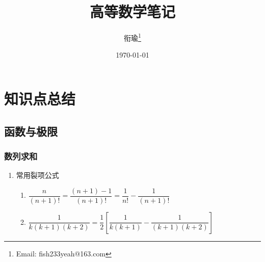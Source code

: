 \documentclass[12pt,a4paper,UTF8]{book}
\begin{document}
\frontmatter
\title{高等数学笔记}
\author{衔瑜\thanks{Email: fish233yeah@163.com}}
\date{\today}
\maketitle
\tableofcontents



\mainmatter
\setlength{\parindent}{0pt}
\chapter{知识点总结}

\section{函数与极限}
\subsection{数列求和}
\begin{enumerate}
\item 常用裂项公式
\begin{enumerate}
\item $\dfrac{n}{\left(n+1\right)!}=\dfrac{\left(n+1\right)-1}{\left(n+1\right)!}=\dfrac{1}{n!}-\dfrac{1}{\left(n+1\right)!}$
\item $\dfrac{1}{k\left(k+1\right)\left(k+2\right)}=\dfrac{1}{2}\left[\dfrac{1}{k\left(k+1\right)}-\dfrac{1}{\left(k+1\right)\left(k+2\right)}\right]$
\end{enumerate}
\end{enumerate}
\end{document}
